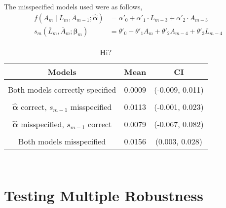 The misspecified models used were as follows, 
\begin{align} 
f(A_m \mid \overline{L}_m, \overline{A}_{m-1}; \hat{\mathbf{\alpha}}) &= \alpha'_{0} + \alpha'_{1} \cdot L_{m-3} + \alpha'_{2} \cdot A_{m-3} \\ 
s_{m}(\overline{L}_{m}, \overline{A}_{m};\mathbf{\beta}_{m}) &= \theta'_0 + \theta'_1 A_{m} +\theta'_2 A_{m-4} + \theta'_3 L_{m-4} 
 \end{align} 

\begin{table}[h!]
\centering
\begin{tabular} {c | c  c}
Models & Mean & CI \\ 
\hline  \\
Both models correctly specified & 0.0009 & (-0.009, 0.011)\\ \\
$\hat{\mathbf{\alpha}}$ correct, $s_{m-1}$ misspecified & 0.0113 & (-0.001, 0.023)\\ \\
$\hat{\mathbf{\alpha}}$ misspecified, $s_{m-1}$ correct & 0.0079 & (-0.067, 0.082) \\ \\
Both models misspecified & 0.0156 & (0.003, 0.028) 
\end{tabular} \\
\centering
\caption{Hi?}
\end{table}


\section{Testing Multiple Robustness} 

